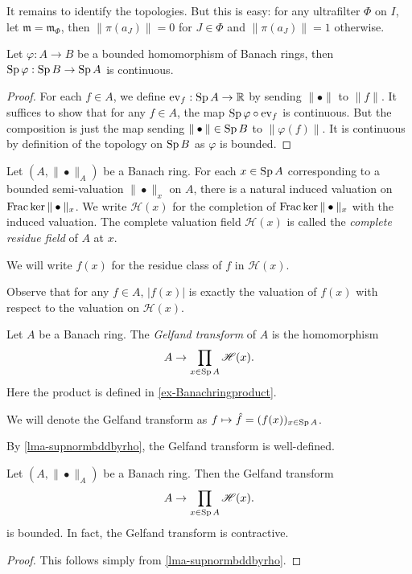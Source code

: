 \begin{example}
    It remains to identify the topologies. But this is easy: for any ultrafilter $\Phi$ on $I$, let $\mathfrak{m}=\mathfrak{m}_{\Phi}$, then $\|\pi(a_J)\|=0$ for $J\in \Phi$ and $\|\pi(a_J)\|=1$ otherwise. 
\end{example}

\begin{proposition}\label{prop-Spcontinuous}
    Let $\varphi:A\rightarrow B$ be a bounded homomorphism of Banach rings, then $\operatorname{Sp} \varphi:\operatorname{Sp} B\rightarrow \operatorname{Sp} A$ is continuous.
\end{proposition}
\begin{proof}
    For each $f\in A$, we define $\mathrm{ev}_f:\operatorname{Sp} A\rightarrow \mathbb{R}$ by sending $\|\bullet\|$ to $\|f\|$.
    It suffices to show that for any $f\in A$, the map $\operatorname{Sp} \varphi\circ\mathrm{ev}_f$ is continuous. But the composition is just the map sending $\|\bullet\|\in \operatorname{Sp} B$ to $\|\varphi(f)\|$. It is continuous by definition of the topology on $\operatorname{Sp} B$ as $\varphi$ is bounded.
\end{proof}

\begin{definition}
    Let $(A,\|\bullet\|_A)$ be a Banach ring. For each $x\in \operatorname{Sp} A$ corresponding to a bounded semi-valuation $\|\bullet\|_x$ on $A$, there is a natural induced valuation on $\operatorname{Frac} \ker \|\bullet\|_x$. We write $\mathscr{H}(x)$ for the completion of $\operatorname{Frac} \ker \|\bullet\|_x$ with the induced valuation. The complete valuation field $\mathscr{H}(x)$ is called the \emph{complete residue field} of $A$ at $x$. 

    We will write $f(x)$ for the residue class of $f$ in $\mathscr{H}(x)$.
\end{definition}
Observe that for any $f\in A$, $|f(x)|$ is exactly the valuation of $f(x)$ with respect to the valuation on $\mathscr{H}(x)$.



\begin{definition}
    Let $A$ be a Banach ring. 
    The \emph{Gelfand transform} of $A$ is the homomorphism
    \[
        A\rightarrow \prod_{x\in \operatorname{Sp} A} \mathscr{H}(x).  
    \]
    Here the product is defined in \cref{ex-Banachringproduct}.

    We will denote the Gelfand transform as $f\mapsto \hat{f}=(f(x))_{x\in \operatorname{Sp} A}$.
\end{definition}
By \cref{lma-supnormbddbyrho}, the Gelfand transform is well-defined.

\begin{proposition}\label{prop-Gelfbdd}
    Let $(A,\|\bullet\|_A)$ be a Banach ring. Then the Gelfand transform
    \[
        A\rightarrow \prod_{x\in \operatorname{Sp} A} \mathscr{H}(x).    
    \]
    is bounded. In fact, the Gelfand transform is contractive.
\end{proposition}
\begin{proof}
    This follows simply from \cref{lma-supnormbddbyrho}.
\end{proof}



